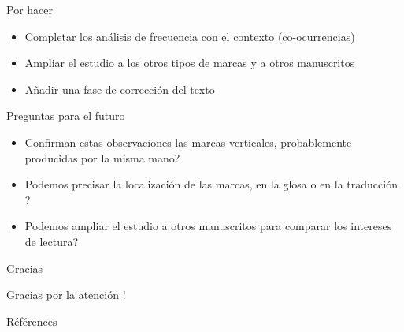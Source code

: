 \documentclass[11pt,aspectratio=169]{beamer}
\begin{document}
\begin{frame}{Por hacer}
\begin{center}
\begin{itemize}
\item Completar los análisis de frecuencia con el contexto (co-ocurrencias)
\item Ampliar el estudio a los otros tipos de marcas y a otros manuscritos
\item Añadir una fase de corrección del texto
\end{itemize}
\end{center}
\end{frame}




\begin{frame}{Preguntas para el futuro}
\begin{center}
\begin{itemize}
\item Confirman estas observaciones las marcas verticales, probablemente producidas por la misma mano? 
\item Podemos precisar la localización de las marcas, en la glosa o en la traducción ?
\item Podemos ampliar el estudio a otros manuscritos para comparar los intereses de lectura?
\end{itemize}
\end{center}
\end{frame}


\begin{frame}{Gracias}
\begin{center}
Gracias por la atención !
\end{center}
\end{frame}



\begin{frame}[allowframebreaks]{Références}
\printbibliography
\end{frame}
\end{document}
